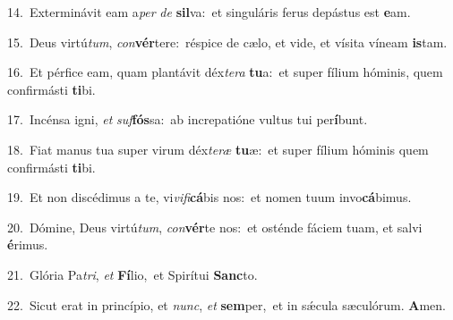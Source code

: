 {\numbfont\textcolor{\numbcolor}{14.}}~Exterminávit eam a\textit{per} \textit{de} \textbf{sil}\-va:~\star et singuláris ferus depástus est \textbf{e}\-am.\par
{\numbfont\textcolor{\numbcolor}{15.}}~Deus virtú\-\textit{tum}\-, \textit{con}\-\textbf{vér}tere:~\star réspice de cælo, et vide, et vísita víneam \textbf{is}\-tam.\par
{\numbfont\textcolor{\numbcolor}{16.}}~Et pérfice eam, quam plantávit déx\-\textit{te}\-\textit{ra} \textbf{tu}\-a:~\star et super fílium hóminis, quem confirmásti \textbf{ti}\-bi.\par
{\numbfont\textcolor{\numbcolor}{17.}}~Incénsa igni, \textit{et} \textit{suf}\-\textbf{fós}sa:~\star ab increpatióne vultus tui per\-\textbf{í}\-bunt.\par
{\numbfont\textcolor{\numbcolor}{18.}}~Fiat manus tua super virum déx\-\textit{te}\-\textit{ræ} \textbf{tu}\-æ:~\star et super fílium hóminis quem confirmásti \textbf{ti}\-bi.\par
{\numbfont\textcolor{\numbcolor}{19.}}~Et non discédimus a te, vi\-\textit{vi}\-\textit{fi}\textbf{cá}bis nos:~\star et nomen tuum invo\-\textbf{cá}\-bimus.\par
{\numbfont\textcolor{\numbcolor}{20.}}~Dómine, Deus virtú\-\textit{tum}\-, \textit{con}\-\textbf{vér}te nos:~\star et osténde fáciem tuam, et salvi \textbf{é}\-rimus.\par
{\numbfont\textcolor{\numbcolor}{21.}}~Glória Pa\-\textit{tri}\-, \textit{et} \textbf{Fí}\-lio,~\star et Spirítui \textbf{Sanc}\-to.\par
{\numbfont\textcolor{\numbcolor}{22.}}~Sicut erat in princípio, et \textit{nunc}\-, \textit{et} \textbf{sem}\-per,~\star et in sǽcula sæculórum. \textbf{A}\-men.\par
